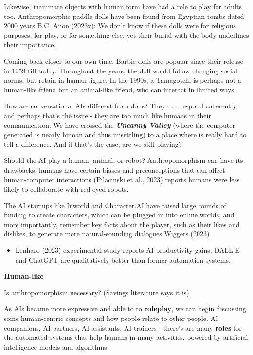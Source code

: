 \documentclass[
  letterpaper,
  DIV=11,
  numbers=noendperiod]{scrartcl}
\providecommand{\tightlist}{%
  \setlength{\itemsep}{0pt}\setlength{\parskip}{0pt}}\usepackage{longtable,booktabs,array}
\begin{document}
Likewise, inanimate objects with human form have had a role to play for
adults too. Anthropomorphic paddle dolls have been found from Egyptian
tombs dated 2000 years B.C. Anon (2023v): We don't know if these dolls
were for religious purposes, for play, or for something else, yet their
burial with the body underlines their importance.

Coming back closer to our own time, Barbie dolls are popular since their
release in 1959 till today. Throughout the years, the doll would follow
changing social norms, but retain in human figure. In the 1990s, a
Tamagotchi is perhaps not a human-like friend but an animal-like friend,
who can interact in limited ways.

How are conversational AIs different from dolls? They can respond
coherently and perhaps that's the issue - they are too much like humans
in their communication. We have crossed the \textbf{\emph{Uncanny
Valley}} (where the computer-generated is nearly human and thus
unsettling) to a place where is really hard to tell a difference. And if
that's the case, are we still playing?

Should the AI play a human, animal, or robot? Anthropomorphism can have
its drawbacks; humans have certain biases and preconceptions that can
affect human-computer interactions (Pilacinski et al., 2023) reports
humans were less likely to collaborate with red-eyed robots.

The AI startups like Inworld and Character.AI have raised large rounds
of funding to create characters, which can be plugged in into online
worlds, and more importantly, remember key facts about the player, such
as their likes and dislikes, to generate more natural-sounding dialogues
Wiggers (2023)

\begin{itemize}
\tightlist
\item
  Lenharo (2023) experimental study reports AI productivity gains,
  DALL-E and ChatGPT are qualitatively better than former automation
  systems.
\end{itemize}

\textbf{Human-like}

Is anthropomorphism necessary? (Savings literature says it is)

As AIs became more expressive and able to to \textbf{roleplay}, we can
begin discussing some human-centric concepts and how people relate to
other people. AI companions, AI partners, AI assistants, AI trainers -
there's are many \textbf{roles} for the automated systems that help
humans in many activities, powered by artificial intelligence models and
algorithms.
\end{document}
